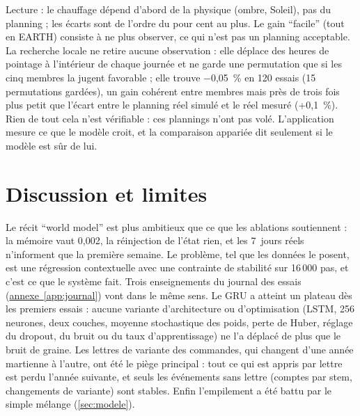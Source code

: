 \documentclass[11pt,a4paper]{article}
\newcommand{\annexeref}[1]{\hyperref[#1]{annexe~\ref*{#1}}}
\begin{document}
Lecture : le chauffage dépend d'abord de la physique (ombre, Soleil), pas du planning ; les écarts sont de l'ordre du pour cent au plus. Le gain \enquote{facile} (tout en EARTH) consiste à ne plus observer, ce qui n'est pas un planning acceptable. La recherche locale ne retire aucune observation : elle déplace des heures de pointage à l'intérieur de chaque journée et ne garde une permutation que si les cinq membres la jugent favorable ; elle trouve $-$0,05~\% en 120 essais (15 permutations gardées), un gain cohérent entre membres mais près de trois fois plus petit que l'écart entre le planning réel simulé et le réel mesuré (+0,1~\%). Rien de tout cela n'est vérifiable : ces plannings n'ont pas volé. L'application mesure ce que le modèle croit, et la comparaison appariée dit seulement si le modèle est sûr de lui.

\section{Discussion et limites}\label{sec:discussion}

Le récit \enquote{world model} est plus ambitieux que ce que les ablations soutiennent : la mémoire vaut 0,002, la réinjection de l'état rien, et les 7~jours réels n'informent que la première semaine. Le problème, tel que les données le posent, est une régression contextuelle avec une contrainte de stabilité sur 16\,000 pas, et c'est ce que le système fait. Trois enseignements du journal des essais (\annexeref{app:journal}) vont dans le même sens. Le GRU a atteint un plateau dès les premiers essais : aucune variante d'architecture ou d'optimisation (LSTM, 256 neurones, deux couches, moyenne stochastique des poids, perte de Huber, réglage du dropout, du bruit ou du taux d'apprentissage) ne l'a déplacé de plus que le bruit de graine. Les lettres de variante des commandes, qui changent d'une année martienne à l'autre, ont été le piège principal : tout ce qui est appris par lettre est perdu l'année suivante, et seuls les événements sans lettre (comptes par stem, changements de variante) sont stables. Enfin l'empilement a été battu par le simple mélange (\autoref{sec:modele}).
\end{document}
